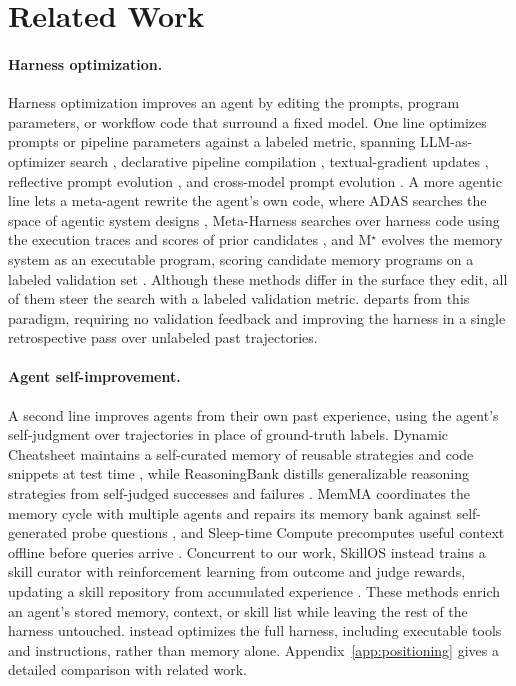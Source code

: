 \section{Related Work}
\label{sec:related}

\paragraph{Harness optimization.}
Harness optimization improves an agent by editing the prompts, program parameters, or workflow code that surround a fixed model.
One line optimizes prompts or pipeline parameters against a labeled metric, spanning LLM-as-optimizer search \citep{yang2023opro}, declarative pipeline compilation \citep{khattab2023dspy}, textual-gradient updates \citep{yuksekgonul2024textgrad}, reflective prompt evolution \citep{agrawal2025gepa}, and cross-model prompt evolution \citep{wu2026mulvul}.
A more agentic line lets a meta-agent rewrite the agent's own code, where ADAS searches the space of agentic system designs \citep{hu2024adas}, Meta-Harness searches over harness code using the execution traces and scores of prior candidates \citep{lee2026metaharness}, and M$^\star$ evolves the memory system as an executable program, scoring candidate memory programs on a labeled validation set \citep{pan2026mstar}.
Although these methods differ in the surface they edit, all of them steer the search with a labeled validation metric.
\method{} departs from this paradigm, requiring no validation feedback and improving the harness in a single retrospective pass over unlabeled past trajectories.

\paragraph{Agent self-improvement.}
 A second line improves agents from their own past experience, using the agent's self-judgment over trajectories in place of ground-truth labels.
Dynamic Cheatsheet maintains a self-curated memory of reusable strategies and code snippets at test time \citep{suzgun2025dynamiccheatsheet}, while ReasoningBank distills generalizable reasoning strategies from self-judged successes and failures \citep{ouyang2026reasoningbank}.
MemMA coordinates the memory cycle with multiple agents and repairs its memory bank against self-generated probe questions \citep{lin2026memma}, and Sleep-time Compute precomputes useful context offline before queries arrive \citep{lin2025sleeptime}.
Concurrent to our work, SkillOS instead trains a skill curator with reinforcement learning from outcome and judge rewards, updating a skill repository from accumulated experience \citep{ouyang2026skillos}.
These methods enrich an agent's stored memory, context, or skill list while leaving the rest of the harness untouched.
\method{} instead optimizes the full harness, including executable tools and instructions, rather than memory alone.
Appendix~\ref{app:positioning} gives a detailed comparison with related work.
